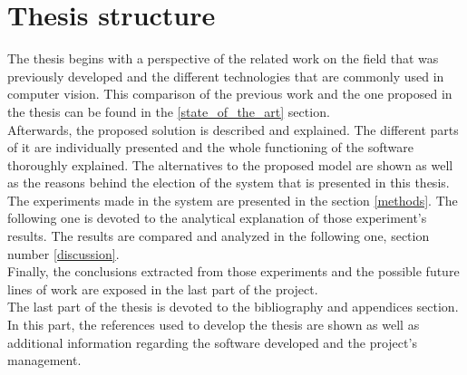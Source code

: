 \section{Thesis structure}

The thesis begins with a perspective of the related work on the field that was previously developed and the different technologies that are commonly used in computer vision. This comparison of the previous work and the one proposed in the thesis can be found in the \ref{state_of_the_art} section. 
\\

Afterwards, the proposed solution is described and explained. The different parts of it are individually presented and the whole functioning of the software thoroughly explained. The alternatives to the proposed model are shown as well as the reasons behind the election of the system that is presented in this thesis. 
\\

The experiments made in the system are presented in the section \ref{methods}. The following one is devoted to the analytical explanation of those experiment's results. 
The results are compared and analyzed in the following one, section number \ref{discussion}. 
\\

Finally, the conclusions extracted from those experiments and the possible future lines of work are exposed in the last part of the project. 
\\

The last part of the thesis is devoted to the bibliography and appendices section. In this part, the references used to develop the thesis are shown as well as additional information regarding the software developed and the project's management. 
